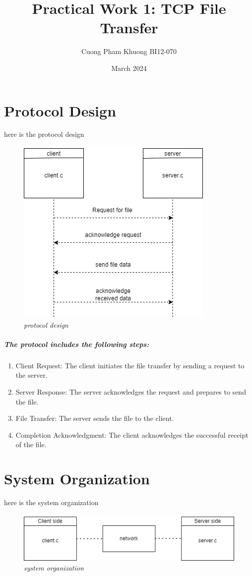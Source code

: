 \documentclass{article}
\title{Practical Work 1: TCP File Transfer}
\author{Cuong Pham Khuong BI12-070}
\date{March 2024}
\begin{document}
\maketitle 

\section{Protocol Design}
here is the protocol design
\begin{figure}[h!]
    \centering
    \includegraphics[width=0.5\linewidth]{protocol_design.drawio (1).png}
    \caption{\textit{protocol design}}
    \label{fig:enter-label}
\end{figure}
\subparagraph{The protocol includes the following steps:}
\begin{enumerate}
    \item Client Request: The client initiates the file transfer by sending a request to the server.
    \item Server Response: The server acknowledges the request and prepares to send the file.
    \item File Transfer: The server sends the file to the client.
    \item Completion Acknowledgment: The client acknowledges the successful receipt of the file.
\end{enumerate}
\section{System Organization}
here is the system organization 
\begin{figure}[h!]
    \centering
    \includegraphics[width=0.5\linewidth]{system organize.drawio.png}
    \caption{\textit{system organization}}
    \label{fig:enter-label}
\end{figure}
\end{document}
